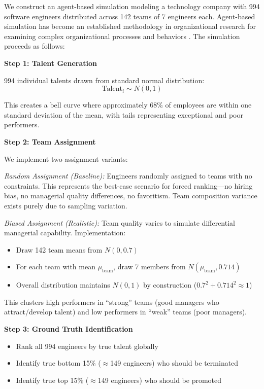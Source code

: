 \documentclass[12pt]{article}
\begin{document}
We construct an agent-based simulation modeling a technology company with 994 software engineers distributed across 142 teams of 7 engineers each. Agent-based simulation has become an established methodology in organizational research for examining complex organizational processes and behaviors \citep{fioretti2013agent, harrison2007simulation, gomez2017agent}. The simulation proceeds as follows:

\textbf{Step 1: Talent Generation}

994 individual talents drawn from standard normal distribution: 
\begin{equation}
\text{Talent}_i \sim N(0, 1)
\end{equation}

This creates a bell curve where approximately 68\% of employees are within one standard deviation of the mean, with tails representing exceptional and poor performers.

\textbf{Step 2: Team Assignment}

We implement two assignment variants:

\emph{Random Assignment (Baseline):} Engineers randomly assigned to teams with no constraints. This represents the best-case scenario for forced ranking---no hiring bias, no managerial quality differences, no favoritism. Team composition variance exists purely due to sampling variation.

\emph{Biased Assignment (Realistic):} Team quality varies to simulate differential managerial capability. Implementation:
\begin{itemize}
\item Draw 142 team means from $N(0, 0.7)$
\item For each team with mean $\mu_{\text{team}}$, draw 7 members from $N(\mu_{\text{team}}, 0.714)$
\item Overall distribution maintains $N(0, 1)$ by construction ($0.7^2 + 0.714^2 \approx 1$)
\end{itemize}

This clusters high performers in ``strong'' teams (good managers who attract/develop talent) and low performers in ``weak'' teams (poor managers).

\textbf{Step 3: Ground Truth Identification}
\begin{itemize}
\item Rank all 994 engineers by true talent globally
\item Identify true bottom 15\% ($\approx$149 engineers) who should be terminated
\item Identify true top 15\% ($\approx$149 engineers) who should be promoted
\end{itemize}
\end{document}
